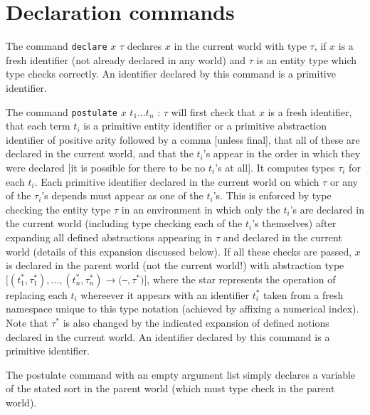 \section{Declaration commands}

The command {\tt declare} $x$ $\tau$ declares $x$ in the current world with type $\tau$, if $x$ is a fresh identifier (not already declared in any world) and $\tau$ is an entity type which type checks correctly.   An identifier declared by this command is a primitive identifier.

The command {\tt postulate} $x$ $t_1\ldots t_n$ : $\tau$  will first check that $x$ is a fresh identifier, that each term $t_i$ is a primitive entity identifier or a primitive abstraction identifier of positive arity followed by a comma [unless final], that all of these are declared in the current world, and that the $t_i$'s appear in the order in which they were declared [it is possible for there to be no $t_i$'s at all].  It computes types $\tau_i$ for each $t_i$.   Each primitive identifier declared in the current world on which $\tau$
or any of the $\tau_i$'s depends must appear as one of the $t_i$'s.   This is enforced by type checking the entity type $\tau$ in an environment in which only the $t_i$'s are declared in the current world (including type checking each of the $t_i$'s themselves)  after expanding all defined abstractions appearing in $\tau$ and declared in the current world (details of this expansion discussed below).   If all these checks are passed, $x$ is declared in the parent world (not the current world!) with abstraction type $[(t_1^*,\tau_1^*),\ldots,(t_n^*,\tau_n^*)\rightarrow(${\tt ---}$,\tau^*)]$, where the star
represents the operation of replacing each $t_i$ whereever it appears with an identifier $t_i^*$ taken from a fresh namespace unique to this type notation (achieved by affixing a numerical index).  Note that $\tau^*$ is also changed by the indicated expansion of defined notions declared in the current world.  An identifier declared by this command is a primitive identifier.

The postulate command with an empty argument list simply declares a variable of the stated sort in the parent world (which must type check in the parent world).

